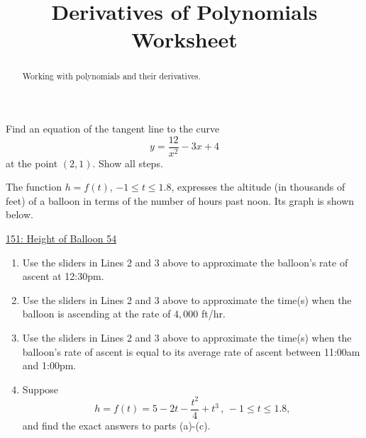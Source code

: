 \documentclass{ximera}
\title{Derivatives of Polynomials Worksheet}
\begin{document}
\begin{abstract}
Working with polynomials and their derivatives.
\end{abstract}
\maketitle


\begin{question} \label{QPov332}

Find an equation of the tangent line to the curve
\[
     y = \frac{12}{x^2} - 3x + 4
\]
at the point $(2, 1)$. Show all steps.

\end{question}


\begin{question} \label{Qldf3rmm1}
The function $h=f(t)$, $-1 \leq t \leq 1.8$, expresses the altitude (in thousands of feet) of a balloon in terms of the number of hours past noon. Its graph is shown below.

\begin{onlineOnly}
    \begin{center}
\end{center}
\end{onlineOnly}

\href{https://www.desmos.com/calculator/8pgzf0orms}{151: Height of Balloon 54}



\begin{enumerate}
\item Use the sliders in Lines 2 and 3 above to approximate the balloon's rate of ascent at 12:30pm.  

\item Use the sliders in Lines 2 and 3 above to approximate the time(s) when the balloon is ascending at the rate of $4,000$ ft/hr. 

\item Use the sliders in Lines 2 and 3 above to approximate the time(s) when the balloon's rate of ascent is equal to its average rate of ascent between 11:00am and 1:00pm. 

\item Suppose
\[
      h = f(t) = 5 - 2t - \frac{t^2}{4}+t^3 \, , \, -1 \leq t \leq 1.8,
\]
and find the exact answers to parts (a)-(c).
\end{enumerate}

\end{question}
\end{document}
